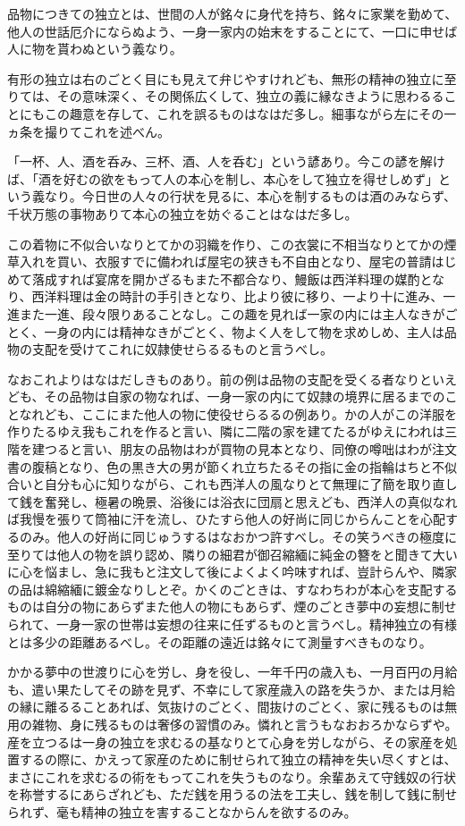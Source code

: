 \documentclass[a4paper, platex, dvipdfmx]{jsarticle}
\begin{document}
品物につきての独立とは、世間の人が銘々に身代を持ち、銘々に家業を勤めて、他人の世話厄介にならぬよう、一身一家内の始末をすることにて、一口に申せば人に物を貰わぬという義なり。

有形の独立は右のごとく目にも見えて弁じやすけれども、無形の精神の独立に至りては、その意味深く、その関係広くして、独立の義に縁なきように思わるることにもこの趣意を存して、これを誤るものはなはだ多し。細事ながら左にその一ヵ条を撮りてこれを述べん。

「一杯、人、酒を呑み、三杯、酒、人を呑む」という諺あり。今この諺を解けば、「酒を好むの欲をもって人の本心を制し、本心をして独立を得せしめず」という義なり。今日世の人々の行状を見るに、本心を制するものは酒のみならず、千状万態の事物ありて本心の独立を妨ぐることはなはだ多し。

この着物に不似合いなりとてかの羽織を作り、この衣裳に不相当なりとてかの煙草入れを買い、衣服すでに備われば屋宅の狭きも不自由となり、屋宅の普請はじめて落成すれば宴席を開かざるもまた不都合なり、鰻飯は西洋料理の媒酌となり、西洋料理は金の時計の手引きとなり、比より彼に移り、一より十に進み、一進また一進、段々限りあることなし。この趣を見れば一家の内には主人なきがごとく、一身の内には精神なきがごとく、物よく人をして物を求めしめ、主人は品物の支配を受けてこれに奴隷使せらるるものと言うべし。

なおこれよりはなはだしきものあり。前の例は品物の支配を受くる者なりといえども、その品物は自家の物なれば、一身一家の内にて奴隷の境界に居るまでのことなれども、ここにまた他人の物に使役せらるるの例あり。かの人がこの洋服を作りたるゆえ我もこれを作ると言い、隣に二階の家を建てたるがゆえにわれは三階を建つると言い、朋友の品物はわが買物の見本となり、同僚の噂咄はわが注文書の腹稿となり、色の黒き大の男が節くれ立ちたるその指に金の指輪はちと不似合いと自分も心に知りながら、これも西洋人の風なりとて無理に了簡を取り直して銭を奮発し、極暑の晩景、浴後には浴衣に団扇と思えども、西洋人の真似なれば我慢を張りて筒袖に汗を流し、ひたすら他人の好尚に同じからんことを心配するのみ。他人の好尚に同じゅうするはなおかつ許すべし。その笑うべきの極度に至りては他人の物を誤り認め、隣りの細君が御召縮緬に純金の簪をと聞きて大いに心を悩まし、急に我もと注文して後によくよく吟味すれば、豈計らんや、隣家の品は綿縮緬に鍍金なりしとぞ。かくのごときは、すなわちわが本心を支配するものは自分の物にあらずまた他人の物にもあらず、煙のごとき夢中の妄想に制せられて、一身一家の世帯は妄想の往来に任ずるものと言うべし。精神独立の有様とは多少の距離あるべし。その距離の遠近は銘々にて測量すべきものなり。

かかる夢中の世渡りに心を労し、身を役し、一年千円の歳入も、一月百円の月給も、遣い果たしてその跡を見ず、不幸にして家産歳入の路を失うか、または月給の縁に離るることあれば、気抜けのごとく、間抜けのごとく、家に残るものは無用の雑物、身に残るものは奢侈の習慣のみ。憐れと言うもなおおろかならずや。産を立つるは一身の独立を求むるの基なりとて心身を労しながら、その家産を処置するの際に、かえって家産のために制せられて独立の精神を失い尽くすとは、まさにこれを求むるの術をもってこれを失うものなり。余輩あえて守銭奴の行状を称誉するにあらざれども、ただ銭を用うるの法を工夫し、銭を制して銭に制せられず、毫も精神の独立を害することなからんを欲するのみ。
\end{document}
